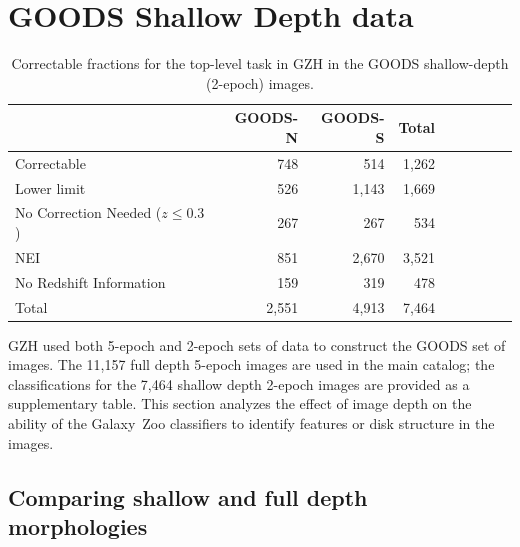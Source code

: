\documentclass[twocolumn]{aastex6}
\begin{document}


\newpage
\clearpage

\appendix

\section{GOODS Shallow Depth data}


\begin{table}
\caption{Correctable fractions for the top-level task in GZH in the GOODS shallow-depth (2-epoch) images. \label{tbl:goods_shallow_categories}}
\begin{tabular}{lrrrrrrrr}
\hline\hline
                                   & GOODS-N & GOODS-S & Total \\
\hline
Correctable                        & 748     & 514     & 1,262 \\
Lower limit                        & 526     & 1,143   & 1,669 \\
No Correction Needed ($z \le 0.3$) & 267     & 267     & 534   \\ 
NEI                                & 851     & 2,670   & 3,521 \\
No Redshift Information            & 159     & 319     & 478   \\
Total                              & 2,551   & 4,913   & 7,464 \\
\hline\hline
\end{tabular}
\end{table}

GZH used both 5-epoch and 2-epoch sets of data to construct the GOODS set of
images. The 11,157 full depth 5-epoch images are used in the main catalog; the
classifications for the 7,464 shallow depth 2-epoch images are provided as a
supplementary table. This section analyzes the effect of image depth on the
ability of the Galaxy~Zoo classifiers to identify features or disk structure in the images. 

\subsection{Comparing shallow and full depth morphologies}
\end{document}
